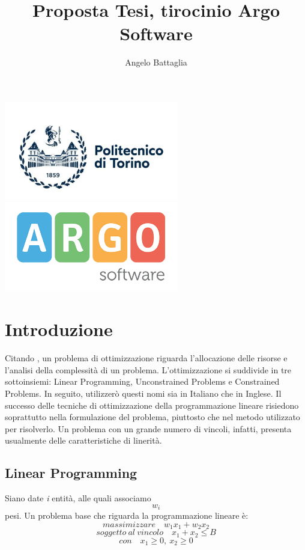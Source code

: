 \documentclass{article}
\author{Angelo Battaglia}
\title{Proposta Tesi, tirocinio Argo Software}
\begin{document}
\maketitle

\begin{center}
\includegraphics[width=3in]{./images/polito.jpg}
\includegraphics[width=3in]{./images/og_logoargosoft.png}
\end{center}

\section{Introduzione}

Citando \textcite{StanfordOptimization}, un problema di ottimizzazione riguarda l'allocazione
delle risorse e l'analisi della complessità di un problema. L'ottimizzazione si suddivide in tre
sottoinsiemi: Linear Programming, Unconstrained Problems e Constrained Problems. In seguito, 
utilizzerò questi nomi sia in Italiano che in Inglese. Il successo delle tecniche di ottimizzazione
della programmazione lineare risiedono soprattutto nella formulazione del problema, piuttosto che
nel metodo utilizzato per risolverlo. Un problema con un grande numero di vincoli, infatti, 
presenta usualmente delle caratteristiche di linerità.

\subsection{Linear Programming}
Siano date \textit{i} entità, alle quali associamo \textit{\[w_i\]} pesi. Un problema base che riguarda 
la programmazione lineare è: \[massimizzare \quad  w_1x_1 + w_2x_2 \]
\[soggetto \ al \ vincolo \quad x_1 + x_2 \leq B \]
\[con \quad x_1\geq 0, \ x_2 \geq 0 \]
\end{document}
